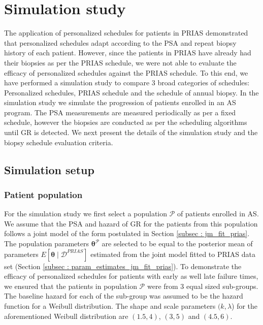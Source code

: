 
\section{Simulation study}
\label{sec: simulation_study}
The application of personalized schedules for patients in PRIAS demonstrated that personalized schedules adapt according to the PSA and repeat biopsy history of each patient. However, since the patients in PRIAS have already had their biopsies as per the PRIAS schedule, we were not able to evaluate the efficacy of personalized schedules against the PRIAS schedule. To this end, we have performed a simulation study to compare 3 broad categories of schedules: Personalized schedules, PRIAS schedule and the schedule of annual biopsy. In the simulation study we simulate the progression of patients enrolled in an AS program. The PSA measurements are measured periodically as per a fixed schedule, however the biopsies are conducted as per the scheduling algorithms until GR is detected. We next present the details of the simulation study and the biopsy schedule evaluation criteria.

\subsection{Simulation setup}
\label{subsec : simulation_setup}
\subsubsection{Patient population}
For the simulation study we first select a population $\mathcal{P}$ of patients enrolled in AS. We assume that the PSA and hazard of GR for the patients from this population follows a joint model of the form postulated in Section \ref{subsec : jm_fit_prias}. The population parameters $\boldsymbol{\theta}^{\mathcal{P}}$ are selected to be equal to the posterior mean of parameters $E[\boldsymbol{\theta} \mid \mathcal{D}^{PRIAS}]$ estimated from the joint model fitted to PRIAS data set (Section \ref{subsec : param_estimates_jm_fit_prias}). To demonstrate the efficacy of personalized schedules for patients with early as well late failure times, we ensured that the patients in population $\mathcal{P}$ were from 3 equal sized sub-groups. The baseline hazard for each of the sub-group was assumed to be the hazard function for a Weibull distribution. The shape and scale parameters $(k, \lambda$) for the aforementioned Weibull distribution are $(1.5, 4)$, $(3, 5)$ and $(4.5, 6)$.

